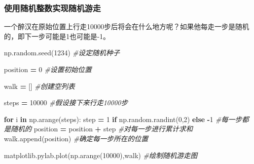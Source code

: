 \documentclass[]{article}
\newenvironment{Shaded}{\begin{snugshade}}{\end{snugshade}}
\newcommand{\KeywordTok}[1]{\textcolor[rgb]{0.13,0.29,0.53}{\textbf{#1}}}
\newcommand{\DecValTok}[1]{\textcolor[rgb]{0.00,0.00,0.81}{#1}}
\newcommand{\CommentTok}[1]{\textcolor[rgb]{0.56,0.35,0.01}{\textit{#1}}}
\newcommand{\ControlFlowTok}[1]{\textcolor[rgb]{0.13,0.29,0.53}{\textbf{#1}}}
\newcommand{\OperatorTok}[1]{\textcolor[rgb]{0.81,0.36,0.00}{\textbf{#1}}}
\newcommand{\NormalTok}[1]{#1}
\begin{document}
\subsubsection{使用随机整数实现随机游走}

一个醉汉在原始位置上行走10000步后将会在什么地方呢？如果他每走一步是随机的，即下一步可能是1也可能是-1。

\begin{Shaded}
\begin{Highlighting}[]
\NormalTok{np.random.seed(}\DecValTok{1234}\NormalTok{) }\CommentTok{#设定随机种子}
\end{Highlighting}
\end{Shaded}

\begin{Shaded}
\begin{Highlighting}[]
\NormalTok{position }\OperatorTok{=} \DecValTok{0} \CommentTok{#设置初始位置}
\end{Highlighting}
\end{Shaded}

\begin{Shaded}
\begin{Highlighting}[]
\NormalTok{walk }\OperatorTok{=}\NormalTok{ [] }\CommentTok{#创建空列表}
\end{Highlighting}
\end{Shaded}

\begin{Shaded}
\begin{Highlighting}[]
\NormalTok{steps }\OperatorTok{=} \DecValTok{10000} \CommentTok{#假设接下来行走10000步}
\end{Highlighting}
\end{Shaded}

\begin{Shaded}
\begin{Highlighting}[]
\ControlFlowTok{for}\NormalTok{ i }\KeywordTok{in}\NormalTok{ np.arange(steps):}
\NormalTok{    step }\OperatorTok{=} \DecValTok{1} \ControlFlowTok{if}\NormalTok{ np.random.randint(}\DecValTok{0}\NormalTok{,}\DecValTok{2}\NormalTok{) }\ControlFlowTok{else} \OperatorTok{-}\DecValTok{1} \CommentTok{#每一步都是随机的}
\NormalTok{    position }\OperatorTok{=}\NormalTok{ position }\OperatorTok{+}\NormalTok{ step }\CommentTok{#对每一步进行累计求和}
\NormalTok{    walk.append(position) }\CommentTok{#确定每一步所在的位置}
\end{Highlighting}
\end{Shaded}

\begin{Shaded}
\begin{Highlighting}[]
\NormalTok{matplotlib.pylab.plot(np.arange(}\DecValTok{10000}\NormalTok{),walk) }\CommentTok{#绘制随机游走图}
\end{Highlighting}
\end{Shaded}
\end{document}

